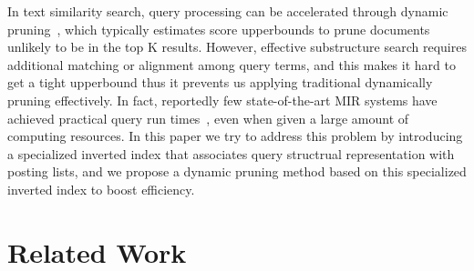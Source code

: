 \documentclass[runningheads]{llncs}
\begin{document}


In text similarity search, query processing can be accelerated through dynamic pruning~\cite{tonellotto2018efficient}, which typically estimates score upperbounds to prune documents unlikely to be in the top K results.
However, effective substructure search requires additional matching or alignment among query terms, and this makes it hard to get a tight upperbound thus it prevents us applying traditional dynamically pruning effectively.
In fact, reportedly few state-of-the-art MIR systems have achieved practical query run times~\cite{ntcir12, mcat_16}, even when given a large amount of computing resources.
In this paper we try to address this problem by introducing a specialized inverted index that associates query structrual representation with posting lists, and we propose a dynamic pruning method based on this specialized inverted index to boost efficiency.


\section{Related Work}
\label{relatedworks}
\end{document}
